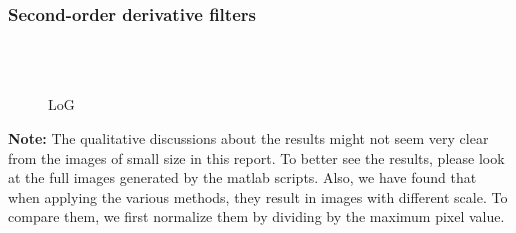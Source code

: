 \documentclass{article}
\begin{document}
\subsubsection{Second-order derivative filters}


\begin{figure}[h]
        \centering
    \caption{ LoG }
    \\ 
    \\ 
    \label{fig:gradients_components_norm}
\end{figure}

\textbf{Note:} The qualitative discussions about the results might not seem very clear from the images of small size in this report. To better see the results, please look at the full images generated by the matlab scripts. Also, we have found that when applying the various methods, they result in images with different scale. To compare them, we first normalize them by dividing by the maximum pixel value.
\end{document}
